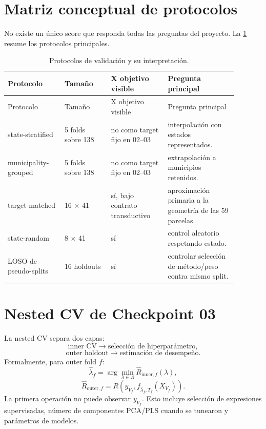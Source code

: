\section{Matriz conceptual de protocolos}

No existe un único score que responda todas las preguntas del proyecto. La
\cref{tab:validation-matrix} resume los protocolos principales.

\begin{longtable}{p{0.22\linewidth}p{0.18\linewidth}p{0.22\linewidth}p{0.27\linewidth}}
\caption{Protocolos de validación y su interpretación.}
\label{tab:validation-matrix}\\
\toprule
Protocolo & Tamaño & X objetivo visible & Pregunta principal \\
\midrule
\endfirsthead
\toprule
Protocolo & Tamaño & X objetivo visible & Pregunta principal \\
\midrule
\endhead
state-stratified & 5 folds sobre 138 & no como target fijo en 02--03 & interpolación con estados representados.\\
municipality-grouped & 5 folds sobre 138 & no como target fijo en 02--03 & extrapolación a municipios retenidos.\\
target-matched & 16 $\times$ 41 & sí, bajo contrato transductivo & aproximación primaria a la geometría de las 59 parcelas.\\
state-random & 8 $\times$ 41 & sí & control aleatorio respetando estado.\\
LOSO de pseudo-splits & 16 holdouts & sí & controlar selección de método/peso contra mismo split.\\
\bottomrule
\end{longtable}

\section{Nested CV de Checkpoint 03}

La nested CV separa dos capas:
\[
\text{inner CV}\rightarrow \text{selección de hiperparámetro},
\]
\[
\text{outer holdout}\rightarrow \text{estimación de desempeño}.
\]
Formalmente, para outer fold $f$:
\[
\hat\lambda_f=
\arg\min_{\lambda\in\Lambda}
\widehat R_{\mathrm{inner},f}(\lambda),
\]
\[
\widehat R_{\mathrm{outer},f}
=
R\left(
y_{V_f},
f_{\hat\lambda_f,T_f}(X_{V_f})
\right).
\]
La primera operación no puede observar $y_{V_f}$. Esto incluye selección de expresiones
supervisadas, número de componentes PCA/PLS cuando se tunearon y parámetros de modelos.

